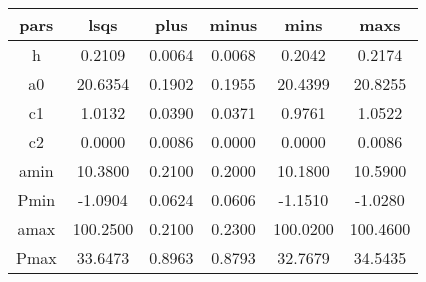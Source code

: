 \begin{table}
\begin{tabular}{cccccc}
\hline \hline
pars & lsqs & plus & minus & mins & maxs \\
\hline
h & 0.2109 & 0.0064 & 0.0068 & 0.2042 & 0.2174 \\
a0 & 20.6354 & 0.1902 & 0.1955 & 20.4399 & 20.8255 \\
c1 & 1.0132 & 0.0390 & 0.0371 & 0.9761 & 1.0522 \\
c2 & 0.0000 & 0.0086 & 0.0000 & 0.0000 & 0.0086 \\
amin & 10.3800 & 0.2100 & 0.2000 & 10.1800 & 10.5900 \\
Pmin & -1.0904 & 0.0624 & 0.0606 & -1.1510 & -1.0280 \\
amax & 100.2500 & 0.2100 & 0.2300 & 100.0200 & 100.4600 \\
Pmax & 33.6473 & 0.8963 & 0.8793 & 32.7679 & 34.5435 \\
\hline
\end{tabular}
\end{table}
